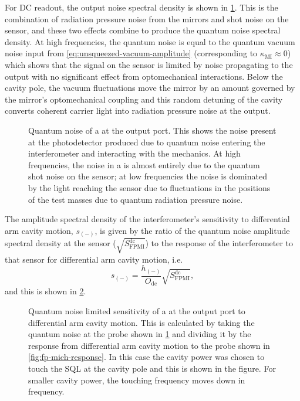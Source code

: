 For \gls{DC} readout, the output noise spectral density is shown in \cref{fig:fp-mich-noise}. This is the combination of radiation pressure noise from the mirrors and shot noise on the sensor, and these two effects combine to produce the quantum noise spectral density. At high frequencies, the quantum noise is equal to the quantum vacuum noise input from \cref{eq:unsqueezed-vacuum-amplitude} (corresponding to $\kappa_{\text{MI}} \approx 0$) which shows that the signal on the sensor is limited by noise propagating to the output with no significant effect from optomechanical interactions. Below the cavity pole, the vacuum fluctuations move the mirror by an amount governed by the mirror's optomechanical coupling and this random detuning of the cavity converts coherent carrier light into radiation pressure noise at the output.

\begin{figure}
  \centering
  
  \caption[Quantum noise of a \FPMI{} at the output port]{\label{fig:fp-mich-noise}Quantum noise of a \FPMI{} at the output port. This shows the noise present at the photodetector produced due to quantum noise entering the interferometer and interacting with the mechanics. At high frequencies, the noise in a \MI{} is almost entirely due to the quantum shot noise on the sensor; at low frequencies the noise is dominated by the light reaching the sensor due to fluctuations in the positions of the test masses due to quantum radiation pressure noise.}
\end{figure}

The amplitude spectral density of the interferometer's sensitivity to differential arm cavity motion, $s_{\left( - \right)}$, is given by the ratio of the quantum noise amplitude spectral density at the sensor ($\sqrt{S_{\text{FPMI}}^{\text{dc}}}$) to the response of the interferometer to that sensor for differential arm cavity motion, i.e.
\begin{equation}
  s_{\left( - \right)} = \frac{h_{\left( - \right)}}{O_{\text{dc}}} \sqrt{S_{\text{FPMI}}^{\text{dc}}},
\end{equation}
and this is shown in \cref{fig:fp-mich-sensitivity}.

\begin{figure}
  \centering
  
  \caption[Sensitivity of a \FPMI{} at the output port to differential arm cavity motion]{\label{fig:fp-mich-sensitivity}Quantum noise limited sensitivity of a \FPMI{} at the output port to differential arm cavity motion. This is calculated by taking the quantum noise at the probe shown in \cref{fig:fp-mich-noise} and dividing it by the response from differential arm cavity motion to the probe shown in \cref{fig:fp-mich-response}. In this case the cavity power was chosen to touch the \gls{SQL} at the cavity pole and this is shown in the figure. For smaller cavity power, the touching frequency moves down in frequency.}
\end{figure}

